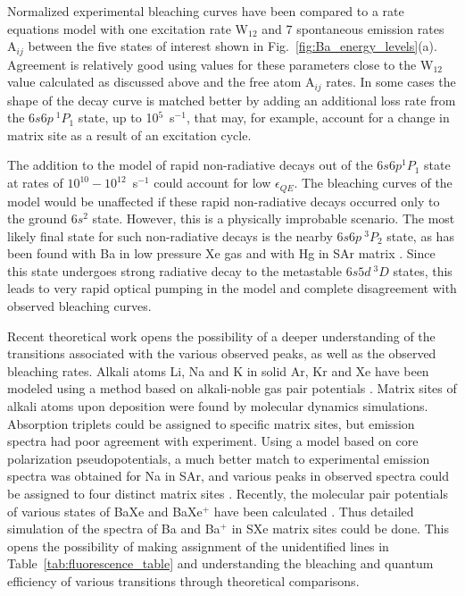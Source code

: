 \documentclass[aps,pra,reprint,superscriptaddress]{revtex4-1}
\begin{document}
Normalized experimental bleaching curves have been compared to a rate equations model with one excitation rate W$_{12}$ and 7 spontaneous emission rates A$_{ij}$ between the five states of interest shown in Fig.~\ref{fig:Ba_energy_levels}(a).  Agreement is relatively good using values for these parameters close to the W$_{12}$ value calculated as discussed above and the free atom A$_{ij}$ rates.  In some cases the shape of the decay curve is matched better by adding an additional loss rate from the $6s6p~^1P_1$ state, up to 10$^5$~s$^{-1}$, that may, for example, account for a change in matrix site as a result of an excitation cycle.

The addition to the model of rapid non-radiative decays out of the $6s6p ^1P_1$ state at rates of $10^{10}-10^{12}$~s$^{-1}$ could account for low $\epsilon_{QE}$.
The bleaching curves of the model would be unaffected if these rapid non-radiative decays occurred only to the ground $6s^2$ state.
However, this is a physically improbable scenario.
The most likely final state for such non-radiative decays is the nearby $6s6p ~^3P_2$ state, as has been found with Ba in low pressure Xe gas and with Hg in SAr matrix \cite{De2009,Crepin1994}.
Since this state undergoes strong radiative decay to the metastable $6s5d ~^3D$ states, this leads to very rapid optical pumping in the model and complete disagreement with observed bleaching curves.

Recent theoretical work opens the possibility of a deeper understanding of the transitions associated with the various observed peaks, as well as the observed bleaching rates.
Alkali atoms Li, Na and K in solid Ar, Kr and Xe have been modeled using a method based on alkali-noble gas pair potentials \cite{Ryan2009}.
Matrix sites of alkali atoms upon deposition were found by molecular dynamics simulations.
Absorption triplets could be assigned to specific matrix sites, but emission spectra had poor agreement with experiment.
Using a model based on core polarization pseudopotentials, a much better match to experimental emission spectra was obtained for Na in SAr, and various peaks in observed spectra could be assigned to four distinct matrix sites \cite{Jacquet2011}.
Recently, the molecular pair potentials of various states of BaXe and BaXe$^+$ have been calculated \cite{Abdessalem2013}.
Thus detailed simulation of the spectra of Ba and Ba$^+$ in SXe matrix sites could be done.
This opens the possibility of making assignment of the unidentified lines in Table~\ref{tab:fluorescence_table} and understanding the bleaching and quantum efficiency of various transitions through theoretical comparisons.
\end{document}
